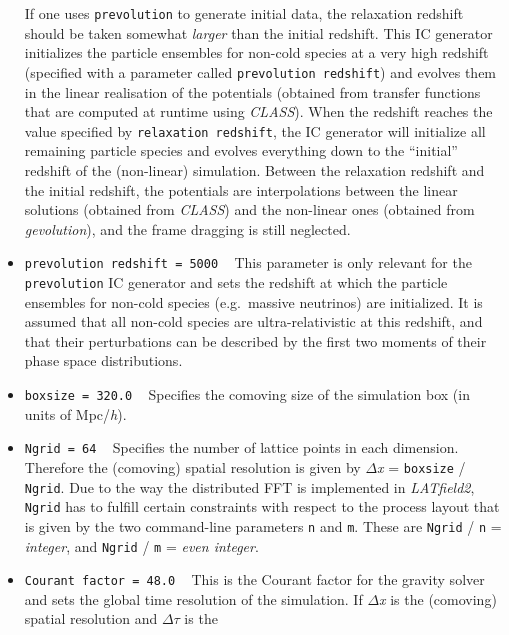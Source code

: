 \documentclass[a4paper,10pt]{article}
\begin{document}
\begin{itemize}
If one uses \texttt{prevolution} to generate initial data, the relaxation redshift should be taken somewhat \textit{larger} than the initial
redshift. This IC generator initializes the particle ensembles for non-cold species at a very high redshift (specified with a parameter
called \texttt{prevolution redshift}) and evolves them in the linear realisation of the potentials (obtained from transfer functions
that are computed at runtime using \textit{CLASS}). When the redshift reaches the value specified by \texttt{relaxation redshift}, the
IC generator will initialize all remaining particle species and evolves everything down to the ``initial'' redshift of the (non-linear)
simulation. Between the relaxation redshift and the initial redshift, the potentials are interpolations between the linear solutions
(obtained from
\textit{CLASS}) and the non-linear ones (obtained from \textit{gevolution}), and the frame dragging is still neglected.
 \item[] \hspace{-25pt}\texttt{prevolution redshift = 5000} ~ This parameter is only relevant for the \texttt{prevolution} IC generator and
 sets the redshift at which the particle ensembles for non-cold species (e.g.\ massive neutrinos) are initialized. It is assumed that all
 non-cold species are ultra-relativistic at this redshift, and that their perturbations can be described by the first two moments of their
 phase space distributions.
 \item[] \hspace{-25pt}\texttt{boxsize = 320.0} ~ Specifies the comoving size of the simulation box (in units of Mpc/\textit{h}).
 \item[] \hspace{-25pt}\texttt{Ngrid = 64} ~ Specifies the number of lattice points in each dimension. Therefore the (comoving) spatial 
 resolution is given by  $\mathsf{\Delta}$\textit{x} = \texttt{boxsize} / \texttt{Ngrid}. Due to the way the distributed FFT is implemented in
 \textit{LATfield2}, \texttt{Ngrid} has to fulfill certain constraints with respect to the process layout that is given by the two command-line
 parameters \texttt{n} and \texttt{m}. These are \texttt{Ngrid} / \texttt{n} = \textit{integer}, and
 \texttt{Ngrid} / \texttt{m} = \textit{even integer}.
 \item[] \hspace{-25pt}\texttt{Courant factor = 48.0} ~ This is the Courant factor for the gravity solver and sets the global time
 resolution of the simulation. If $\mathsf{\Delta}$\textit{x} is the (comoving) spatial resolution and $\mathsf{\Delta\tau}$ is the

\end{itemize}
\end{document}
